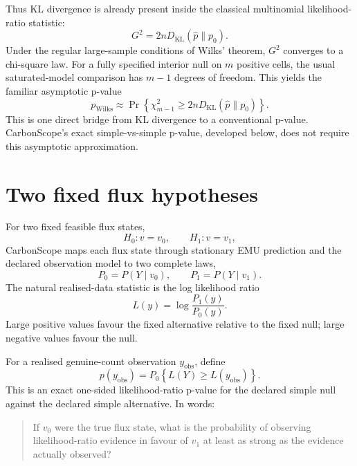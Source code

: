 \documentclass[11pt]{article}
\newcommand{\KL}{D_{\mathrm{KL}}}
\newcommand{\Pnull}{P_0}
\newcommand{\Palt}{P_1}
\begin{document}
Thus KL divergence is already present inside the classical multinomial
likelihood-ratio statistic:
\begin{equation}
\boxed{G^2=2n\KL(\widehat p\|p_0).}
\end{equation}
Under the regular large-sample conditions of Wilks' theorem, $G^2$ converges to
a chi-square law. For a fully specified interior null on $m$ positive cells,
the usual saturated-model comparison has $m-1$ degrees of freedom. This yields
the familiar asymptotic p-value
\begin{equation}
p_{\mathrm{Wilks}}
\approx
\Pr\!\left\{\chi^2_{m-1}\ge 2n\KL(\widehat p\|p_0)\right\}.
\end{equation}
This is one direct bridge from KL divergence to a conventional p-value.
CarbonScope's exact simple-vs-simple p-value, developed below, does not require this
asymptotic approximation.

\section{Two fixed flux hypotheses}

For two fixed feasible flux states,
\begin{equation}
H_0:v=v_0,
\qquad
H_1:v=v_1,
\end{equation}
CarbonScope maps each flux state through stationary EMU prediction and the declared
observation model to two complete laws,
\begin{equation}
\Pnull=P(Y\mid v_0),
\qquad
\Palt=P(Y\mid v_1).
\end{equation}
The natural realised-data statistic is the log likelihood ratio
\begin{equation}
L(y)=\log\frac{\Palt(y)}{\Pnull(y)}.
\end{equation}
Large positive values favour the fixed alternative relative to the fixed null;
large negative values favour the null.

For a realised genuine-count observation $y_{\mathrm{obs}}$, define
\begin{equation}
\boxed{
p(y_{\mathrm{obs}})
=
\Pnull\!\left\{L(Y)\ge L(y_{\mathrm{obs}})\right\}.
}
\end{equation}
This is an exact one-sided likelihood-ratio p-value for the declared simple
null against the declared simple alternative. In words:

\begin{quote}
If $v_0$ were the true flux state, what is the probability of observing
likelihood-ratio evidence in favour of $v_1$ at least as strong as the evidence
actually observed?
\end{quote}
\end{document}
